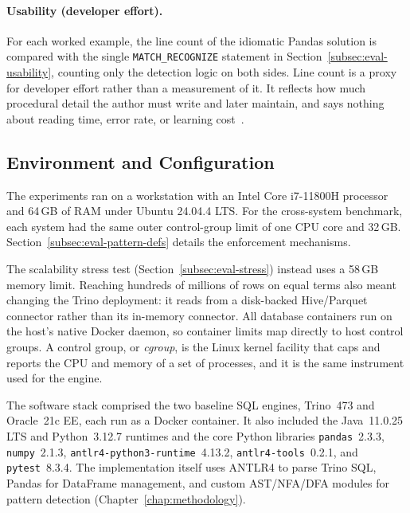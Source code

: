 \paragraph{Usability (developer effort).}
For each worked example, the line count of the idiomatic Pandas
solution is compared with the single \texttt{MATCH\_RECOGNIZE}
statement in Section~\ref{subsec:eval-usability}, counting only the
detection logic on both sides.  Line count is a proxy for developer
effort rather than a measurement of it.  It reflects how much
procedural detail the author must write and later maintain, and says
nothing about reading time, error rate, or learning
cost~\cite{iso2016,ISO2021,melton2017sqlrpr,Python_UDF}.

\subsection{Environment and Configuration}
\label{subsec:eval-environment}

The experiments ran on a workstation with an Intel Core i7-11800H
processor and 64\,GB of RAM under Ubuntu 24.04.4 LTS.  For the
cross-system benchmark, each system had the same outer control-group
limit of one CPU core and 32\,GB.
Section~\ref{subsec:eval-pattern-defs} details the
enforcement mechanisms.

The scalability stress test (Section~\ref{subsec:eval-stress}) instead
uses a 58\,GB memory limit.  Reaching hundreds of millions of rows on equal
terms also meant changing the Trino deployment: it reads from a
disk-backed Hive/Parquet connector rather than its in-memory
connector.  All database containers run on the
host's native Docker daemon, so container limits map directly to host
control groups.  A control group, or \emph{cgroup}, is the Linux kernel
facility that caps and reports the CPU and memory of a set of
processes, and it is the same instrument used for the engine.

The software stack comprised the two baseline SQL engines, Trino~473 and
Oracle~21c EE, each run as a Docker container.  It also included the
Java~11.0.25 LTS and Python~3.12.7 runtimes and the core Python
libraries \texttt{pandas}~2.3.3, \texttt{numpy}~2.1.3,
\texttt{antlr4-python3-\allowbreak{}runtime}~4.13.2,
\texttt{antlr4-\allowbreak{}tools}~0.2.1, and \texttt{pytest}~8.3.4.
The implementation itself uses ANTLR4 to parse Trino SQL,
Pandas for DataFrame management, and custom AST/NFA/DFA
modules for pattern detection (Chapter~\ref{chap:methodology}).

